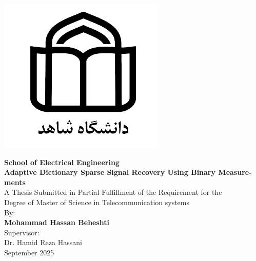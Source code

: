 \centerline{\includegraphics[scale=1.3]{./Images/general/logo_en.png}}
\begin{latin}
\begin{center}
\large
\vspace{-1mm}
\textbf{School of Electrical Engineering}
\\[3cm]
\textbf{Adaptive Dictionary Sparse Signal Recovery Using Binary Measurements}
\\[1.5cm]
A Thesis Submitted in Partial Fulfillment of the Requirement for the 
\\[0.5cm]
Degree of Master of Science in Telecommunication systems 
\\[1cm]
By: 
\\[0.5cm]
\textbf{Mohammad Hassan Beheshti}
\\[1cm]
Supervisor:
\\[0.5cm]
Dr. Hamid Reza Hassani
\\[1cm]
September 2025

\end{center}
\end{latin}